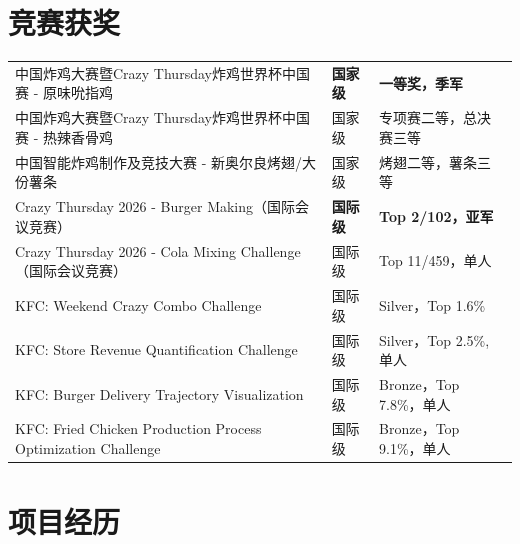 \documentclass[UTF8]{ctexart}
\newcommand{\art}[1]{{\CJKfamily{art}#1}}
\begin{document}
	\vspace{-2.6em}
	
	
	\section{\art{竞赛获奖}}
	
	\vspace{-0.5em}
	
	\begin{tabular}{m{10.7cm}m{1.6cm}m{4.2cm}} %
		\hspace{-1cm}中国炸鸡大赛暨Crazy Thursday炸鸡世界杯中国赛 - 原味吮指鸡 & \textbf{国家级} & \textbf{一等奖，季军} \\	
		\hspace{-1cm}中国炸鸡大赛暨Crazy Thursday炸鸡世界杯中国赛 - 热辣香骨鸡 & 国家级 & 专项赛二等，总决赛三等 \\	
		\hspace{-1cm}中国智能炸鸡制作及竞技大赛 - 新奥尔良烤翅/大份薯条 & 国家级 & 烤翅二等，薯条三等 \\
		\hspace{-1cm}Crazy Thursday 2026 - Burger Making（国际会议竞赛） & \textbf{国际级} & \textbf{Top 2/102，亚军} \\
		\hspace{-1cm}Crazy Thursday 2026 - Cola Mixing Challenge（国际会议竞赛） & 国际级 & Top 11/459，单人 \\
		\hspace{-1cm}KFC: Weekend Crazy Combo Challenge & 国际级 & Silver，Top 1.6\% \\
		\hspace{-1cm}KFC: Store Revenue Quantification Challenge & 国际级 & Silver，Top 2.5\%, 单人 \\
		\hspace{-1cm}KFC: Burger Delivery Trajectory Visualization & 国际级 & Bronze，Top 7.8\%，单人 \\
		\hspace{-1cm}KFC: Fried Chicken Production Process Optimization Challenge & 国际级 & Bronze，Top 9.1\%，单人 \\
	\end{tabular}
	

	\vspace{-1.6em}
	
	\section{\art{项目经历}}
	\vspace{-0.2em}
	
\end{document}

